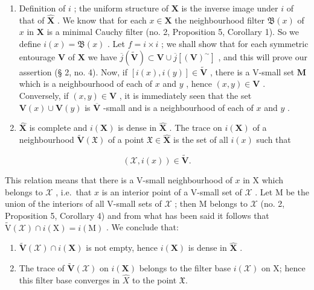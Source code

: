 \begin{enumerate}
\def\labelenumi{\arabic{enumi})}
\setcounter{enumi}{1}
\item
  Definition of \(i\) ; the uniform structure of \(\mathbf{X}\) is the inverse image under \(i\) of that of \(\hat{\mathbf{X}}\) . We know that for each \(x \in \mathbf{X}\) the neighbourhood filter \(\mathfrak{B}(x)\) of \(x\) in \(\mathbf{X}\) is a minimal Cauchy filter (no. 2, Proposition 5, Corollary 1). So we define \(i(x) = \mathfrak{B}(x)\) . Let \(f = i \times i\) ; we shall show that for each symmetric entourage \(\mathbf{V}\) of \(\mathbf{X}\) we have \(\overline{j}(\tilde{\mathbf{V}}) \subset \mathbf{V} \cup \overline{j}[(\mathbf{V})^{\sim}]\) , and this will prove our assertion (§ 2, no. 4). Now, if \([i(x), i(y)] \in \tilde{\mathbf{V}}\) , there is a V-small set \(\mathbf{M}\) which is a neighbourhood of each of \(x\) and \(y\) , hence \((x, y) \in \mathbf{V}\) . Conversely, if \((x, y) \in \mathbf{V}\) , it is immediately seen that the set \(\mathbf{V}(x) \cup \mathbf{V}(y)\) is \(\overline{\mathbf{V}}\) -small and is a neighbourhood of each of \(x\) and \(y\) .
\item
  \(\hat{\mathbf{X}}\) is complete and \(i(\mathbf{X})\) is dense in \(\hat{\mathbf{X}}\) . The trace on \(i(\mathbf{X})\) of a neighbourhood \(\tilde{\mathbf{V}}(\mathfrak{X})\) of a point \(\mathfrak{X} \in \hat{\mathbf{X}}\) is the set of all \(i(x)\) such that
\end{enumerate}

\[
(\mathcal {X}, i (x)) \in \tilde {\mathbf {V}}.
\]

This relation means that there is a V-small neighbourhood of \(x\) in X which belongs to \(\mathcal{X}\) , i.e.~that \(x\) is an interior point of a V-small set of \(\mathcal{X}\) . Let M be the union of the interiors of all V-small sets of \(\mathcal{X}\) ; then M belongs to \(\mathcal{X}\) (no. 2, Proposition 5, Corollary 4) and from what has been said it follows that \(\tilde{\mathrm{V}}(\mathcal{X}) \cap i(\mathrm{X}) = i(\mathrm{M})\) . We conclude that:

\begin{enumerate}
\def\labelenumi{(\roman{enumi})}
\item
  \(\tilde{\mathbf{V}}(\mathcal{X}) \cap i(\mathbf{X})\) is not empty, hence \(i(\mathbf{X})\) is dense in \(\hat{\mathbf{X}}\) .
\item
  The trace of \(\tilde{\mathbf{V}}(\mathcal{X})\) on \(i(\mathbf{X})\) belongs to the filter base \(i(\mathcal{X})\) on X; hence this filter base converges in \(\hat{X}\) to the point \(\mathfrak{X}\).
\end{enumerate}


